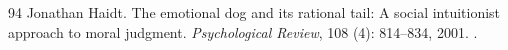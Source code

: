\documentclass[11pt]{article}
\theoremstyle{plain}
\theoremstyle{definition}
\theoremstyle{remark}
\begin{document}
\begin{thebibliography}{94}
Jonathan Haidt.
\newblock The emotional dog and its rational tail: A social intuitionist
  approach to moral judgment.
\newblock \emph{Psychological Review}, 108 (4): 814--834,
  2001.
\newblock {}.

\end{thebibliography}
\end{document}
